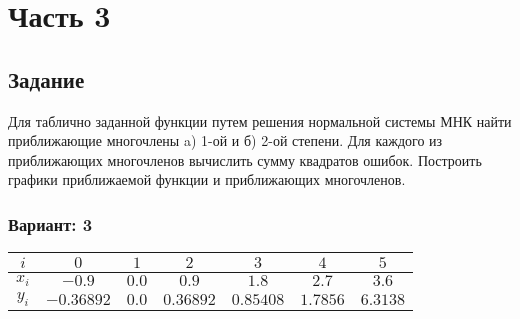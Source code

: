 
\chapter*{Часть 3}

\section*{Задание}
Для таблично заданной функции путем решения нормальной системы МНК
найти приближающие многочлены a) 1-ой  и б) 2-ой степени.
Для каждого из приближающих многочленов вычислить сумму квадратов ошибок.
Построить графики приближаемой функции и приближающих многочленов.

\subsection*{Вариант: 3}

\begin{center}
    
\begin{tabular}{|c|c|c|c|c|c|c|}
    \hline
    $i$ & $0$ & $1$ & $2$ & $3$ & $4$ & $5$ \\
    \hline
    $x_i$ & $-0.9$ & $0.0$ & $0.9$ & $1.8$ & $2.7$ & $3.6$ \\
    \hline
    $y_i$ & $-0.36892$ & $0.0$ & $0.36892$ & $0.85408$ & $1.7856$ & $6.3138$ \\ 
    \hline
\end{tabular}
\end{center}

\pagebreak